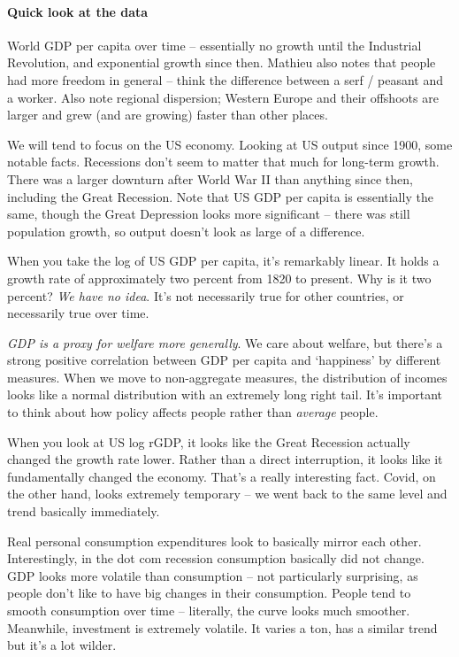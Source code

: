 \documentclass[10pt]{article}
\begin{document}
\paragraph{Quick look at the data} World GDP per capita over time -- essentially no growth until the Industrial Revolution, and exponential growth since then. Mathieu also notes that people had more freedom in general -- think the difference between a serf / peasant and a worker. Also note regional dispersion; Western Europe and their offshoots are larger and grew (and are growing) faster than other places. 

We will tend to focus on the US economy. Looking at US output since 1900, some notable facts. Recessions don't seem to matter that much for long-term growth. There was a larger downturn after World War II than anything since then, including the Great Recession. Note that US GDP per capita is essentially the same, though the Great Depression looks more significant -- there was still population growth, so output doesn't look as large of a difference. 

When you take the log of US GDP per capita, it's remarkably linear. It holds a growth rate of approximately two percent from 1820 to present. Why is it two percent? \emph{We have no idea}. It's not necessarily true for other countries, or necessarily true over time.

\emph{GDP is a proxy for welfare more generally}. We care about welfare, but there's a strong positive correlation between GDP per capita and `happiness' by different measures. When we move to non-aggregate measures, the distribution of incomes looks like a normal distribution with an extremely long right tail. It's important to think about how policy affects people rather than \emph{average} people.

When you look at US log rGDP, it looks like the Great Recession actually changed the growth rate lower. Rather than a direct interruption, it looks like it fundamentally changed the economy. That's a really interesting fact. Covid, on the other hand, looks extremely temporary -- we went back to the same level and trend basically immediately. 

Real personal consumption expenditures look to basically mirror each other. Interestingly, in the dot com recession consumption basically did not change. GDP looks more volatile than consumption -- not particularly surprising, as people don't like to have big changes in their consumption. People tend to smooth consumption over time -- literally, the curve looks much smoother. Meanwhile, investment is extremely volatile. It varies a ton, has a similar trend but it's a lot wilder.
\end{document}
